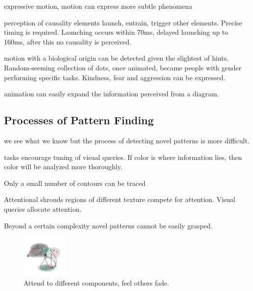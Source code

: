 \begin{mdframed}
\begin{multicols}{2}
\begin{compactdesc}
    \item[expressive motion,] motion can express more subtle phenomena
    \item[perception of causality] elements launch, entrain, trigger
        other elements. Precise timing is required.
        Launching occurs within 70ms, delayed launching up to 160ms, after
        this no causality is perceived.
    \item[motion with a biological] origin can be detected given the slightest
        of hints. Random-seeming collection of dots, once animated, became
        people with gender performing specific tasks. Kindness, fear and
        aggression can be expressed.
    \item[animation] can easily expand the information perceived from a
        diagram.
\end{compactdesc}
\end{multicols}\end{mdframed}


\begin{mdframed}\begin{multicols}{2}
\subsection{Processes of Pattern Finding}
\begin{compactdesc}
    \item[we see what we know] but the process of detecting novel patterns
        is more difficult.
    \item[tasks encourage] tuning of visual queries. If color is where
        information lies, then color will be analyzed more thoroughly.
    \item[Only a small] number of contours can be traced
    \item[Attentional shrouds] regions of different texture compete
        for attention. Visual queries allocate attention.
    \item[Beyond a certain complexity] novel patterns cannot be easily
        grasped.
\end{compactdesc}
\begin{figure}[H]
\centering
\includegraphics[width=0.2\textwidth]{pattern_vis.png}
\caption{Attend to different components, feel others fade.}
\end{figure}
\end{multicols}\end{mdframed}




